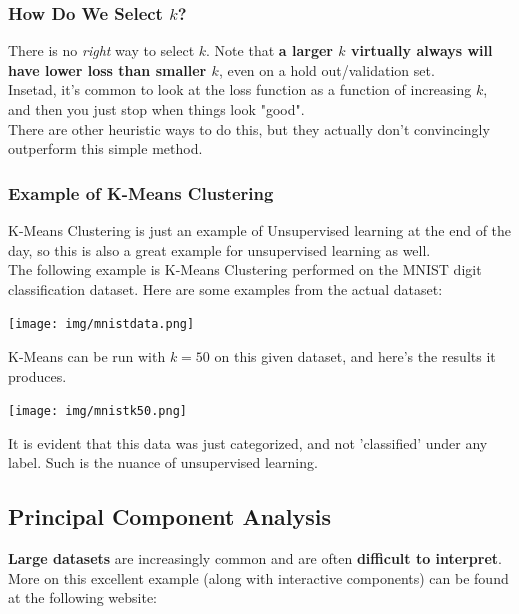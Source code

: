 \documentclass[english, 10pt]{article}
\begin{document}
\subsubsection{How Do We Select $k$?}

There is no \textit{right} way to select $k$. Note that \textbf{a larger $k$ virtually always will have lower loss than smaller $k$}, even on a hold out/validation set.\\

Insetad, it's common to look at the loss function as a function of increasing $k$, and then you just stop when things look "good".\\

There are other heuristic ways to do this, but they actually don't convincingly outperform this simple method.

\subsubsection{Example of K-Means Clustering}

K-Means Clustering is just an example of Unsupervised learning at the end of the day, so this is also a great example for unsupervised learning as well.\\

The following example is K-Means Clustering performed on the MNIST digit classification dataset. Here are some examples from the actual dataset:\\

{
\centering

\texttt{[image: img/mnistdata.png]}

}

\hfill \break K-Means can be run with $k=50$ on this given dataset, and here's the results it produces.\\

{
\centering

\texttt{[image: img/mnistk50.png]}

}

\hfill \break It is evident that this data was just categorized, and not 'classified' under any label. Such is the nuance of unsupervised learning.\\

\subsection{Principal Component Analysis}

\textbf{Large datasets} are increasingly common and are often \textbf{difficult to interpret}. More on this excellent example (along with interactive components) can be found at the following website:\\
\end{document}
